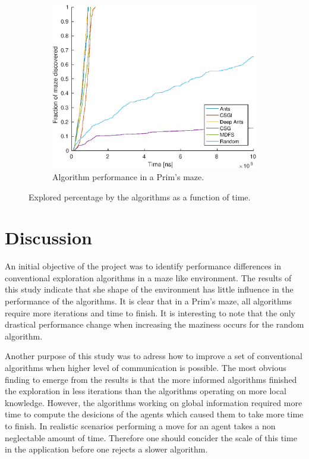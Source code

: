 \documentclass{article}
\begin{document}
\begin{figure}[H]
    \begin{subfigure}[b]{0.45\textwidth}
        \includegraphics[width=\textwidth]{Covered_vs_time_for_3_agents_on_50x50_map_Easy=10.eps}
        \caption{ Algorithm performance in a Prim's maze. }
    \end{subfigure}
    
    \caption{Explored percentage by the algorithms as a function of
      time.}
    \label{fig:perf_time}
\end{figure}

\section{Discussion}

An initial objective of the project was to identify performance differences in
conventional exploration algorithms in a maze like environment. The results of
this study indicate that she shape of the environment has little influence in
the performance of the algorithms. It is clear that in a Prim's maze, all
algorithms require more iterations and time to finish. It is interesting to note
that the only drastical performance change when increasing the maziness occurs
for the random algorithm.

Another purpose of this study was to adress how to improve a set of conventional
algorithms when higher level of communication is possible. The most obvious
finding to emerge from the results is that the more informed algorithms finished
the exploration in less iterations than the algorithms operating on more local
knowledge. However, the algorithms working on global information required more
time to compute the desicions of the agents which caused them to take more time
to finish. In realistic scenarios performing a move for an agent takes a non
neglectable amount of time. Therefore one should concider the scale of this time
in the application before one rejects a slower algorithm.
\end{document}
